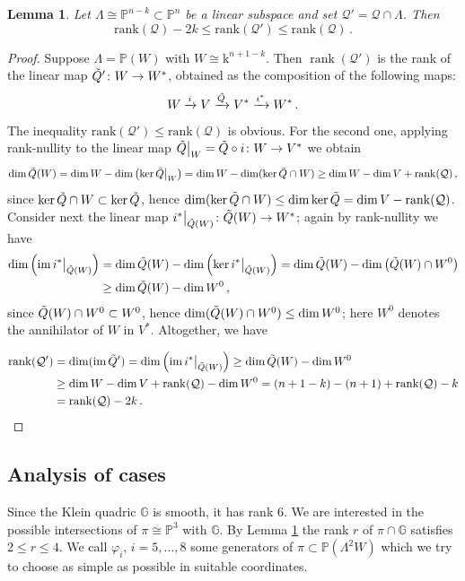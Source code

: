 \documentclass[10pt,reqno]{amsart}
\newcommand{\cQ}{\mathcal{Q}}
\newcommand{\GG}{\mathbb{G}}
\newcommand{\PP}{\mathbb P}
\newcommand{\im}{\operatorname{im}}
\DeclareMathOperator{\rank}{rank}
\newcommand{\f}{\varphi}
\renewcommand{\L}{\Lambda}
\newcommand{\kk}{\mathrm{k}}
\newtheorem{lemma}[theorem]{Lemma}
\theoremstyle{definition}
\begin{document}
\begin{lemma}\label{lem:quadric_intersection}
Let $\Lambda\cong\PP^{n-k}\subset\PP^n$ be a linear subspace and set $\cQ'=\cQ\cap \Lambda$. Then
\[
\textrm{rank}(\cQ)-2k\leq \textrm{rank}(\cQ')\leq \textrm{rank}(\cQ)\,.
\]
\end{lemma}
\begin{proof}
 Suppose $\Lambda=\PP(W)$ with $W\cong\kk^{n+1-k}$. Then $\rank(\cQ')$ is the rank of the linear map $\Tilde{Q}'\colon W\to W^*$, obtained as the composition of the following maps:
 \[
 W\xrightarrow{i} V\xrightarrow{\Tilde{Q}}V^*\xrightarrow{i^*}W^*\,.
 \]
 The inequality $\textrm{rank}(\cQ')\leq \textrm{rank}(\cQ)$ is obvious. For the second one, applying rank-nullity to the linear map $\Tilde{Q}\big|_W=\Tilde{Q}\circ i\colon W\to V^*$ we obtain
 \[
 \dim \Tilde{Q}(W)=\dim W-\dim\left(\ker \Tilde{Q}\big|_W\right)=\dim W-\dim(\ker\Tilde{Q}\cap W)\geq \dim W-\dim V+\rank(\cQ)\,,
 \]
 since $\ker\Tilde{Q}\cap W\subset\ker\Tilde{Q}$, hence $\dim(\ker\Tilde{Q}\cap W)\leq \dim\ker\Tilde{Q}=\dim V-\rank(\cQ)$. Consider next the linear map $i^*\big|_{\Tilde{Q}(W)}\colon\Tilde{Q}(W)\to W^*$; again by rank-nullity we have
 \begin{align*}
 \dim\left(\im i^*\big|_{\Tilde{Q}(W)}\right)&=\dim \Tilde{Q}(W)-\dim\left(\ker i^*\big|_{\Tilde{Q}(W)}\right)=\dim \Tilde{Q}(W)-\dim\left(\Tilde{Q}(W)\cap W^0\right)\\
 &\geq\dim \Tilde{Q}(W)-\dim W^0\,,    
 \end{align*}
 since $\Tilde{Q}(W)\cap W^0\subset W^0$, hence $\dim(\Tilde{Q}(W)\cap W^0)\leq \dim W^0$; here $W^0$ denotes the annihilator of $W$ in $V^*$. Altogether, we have
 
 \begin{align*}
 \rank(\cQ')&=\dim(\im \Tilde{Q}')=\dim \left(\im i^*\big|_{\Tilde{Q}(W)}\right)\geq\dim \Tilde{Q}(W)-\dim W^0\\
 &\geq \dim W-\dim V+\rank(\cQ)-\dim W^0=(n+1-k)-(n+1)+\rank(\cQ)-k\\
 &=\rank(\cQ)-2k\,.
 \end{align*}

\end{proof}



\subsection{Analysis of cases} Since the Klein quadric $\GG$ is smooth, it has rank 6. We are interested in the possible intersections of $\pi\cong\PP^3$ with $\GG$. By Lemma \ref{lem:quadric_intersection} the rank $r$ of $\pi\cap\GG$ satisfies $2\leq r\leq 4$. We call $\f_i$, $i=5,\ldots,8$ some generators of $\pi \subset \PP(\L^2 W)$ which we try to choose as simple as possible in suitable coordinates.
\end{document}
